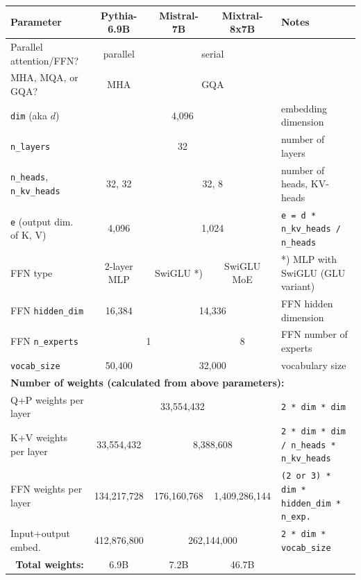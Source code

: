 \documentclass{article}
\begin{document}
\begingroup
\renewcommand{\arraystretch}{1.3} %
\begin{center} \begin{tabular}{|l|c|c|c|l|} \hline
  \textbf{Parameter} & \textbf{Pythia-6.9B} & \textbf{Mistral-7B} & \textbf{Mixtral-8x7B} & \textbf{Notes} \\ \hline
  Parallel attention/FFN? & parallel         & \multicolumn{2}{c|}{serial} & \citep{parallel}              \\ \hline
  MHA, MQA, or GQA?       & MHA              & \multicolumn{2}{c|}{GQA}    & \citep{vanilla, MQA, GQA}     \\ \hline
  \verb+dim+ (aka $d$)    & \multicolumn{3}{c|}{4,096}                     & embedding dimension           \\ \hline
  \verb+n_layers+         & \multicolumn{3}{c|}{32}                        & number of layers              \\ \hline
  \verb+n_heads+, \verb+n_kv_heads+ & 32, 32 & \multicolumn{2}{c|}{32, 8}  & number of heads, KV-heads     \\ \hline
  \verb+e+ (output dim. of K, V) & 4,096     & \multicolumn{2}{c|}{1,024}  & \verb+e = d * n_kv_heads / n_heads+ \\ \hline
  FFN type                & 2-layer MLP      & SwiGLU *) & SwiGLU MoE      & *) MLP with SwiGLU (GLU variant) \citep{GLU, MoE} \\ \hline
  FFN \verb+hidden_dim+   & 16,384           & \multicolumn{2}{c|}{14,336} & FFN hidden dimension          \\ \hline
  FFN \verb+n_experts+    & \multicolumn{2}{c|}{1}  & 8                    & FFN number of experts         \\ \hline
  \verb+vocab_size+       & 50,400           & \multicolumn{2}{c|}{32,000} & vocabulary size               \\ \hline

  \multicolumn{5}{|l|}{\textbf{Number of weights (calculated from above parameters):}}                                 \\ \hline
  Q+P weights per layer & \multicolumn{3}{c|}{33,554,432}                & \verb+2 * dim * dim+                        \\ \hline
  K+V weights per layer & 33,554,432  & \multicolumn{2}{c|}{8,388,608}   & \verb+2 * dim * dim / n_heads * n_kv_heads+ \\ \hline
  FFN weights per layer & 134,217,728 & 176,160,768 & 1,409,286,144      & \verb+(2 or 3) * dim * hidden_dim * n_exp.+ \\ \hline
  Input+output embed.   & 412,876,800 & \multicolumn{2}{c|}{262,144,000} & \verb+2 * dim * vocab_size+                 \\ \hline
  \multicolumn{1}{|r|}{\textbf{Total weights:}} & 6.9B & 7.2B &  46.7B   &                                             \\ \hline
\end{tabular} \end{center}
\endgroup
\end{document}
